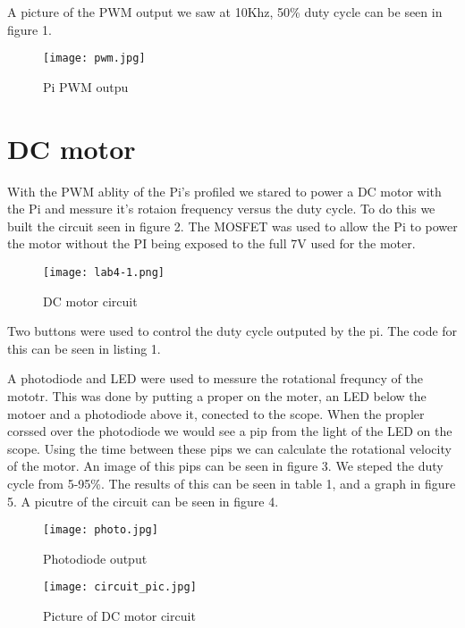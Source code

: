 \documentclass[prl,12pt,notitlepage,aps,onecolumn,superscriptaddress]{revtex4-1}
\begin{document}
A picture of the PWM output we saw at 10Khz, 50\% duty cycle can be seen in figure 1.

\begin{figure}[h]
\begin{center}
\texttt{[image: pwm.jpg]}
\end{center}
\caption{\label{fig:pic} Pi PWM outpu}
\end{figure}

\section{DC motor}
With the PWM ablity of the Pi's profiled we stared to power a DC motor with the Pi and messure it's rotaion frequency versus the duty cycle. To do this we built the circuit seen in figure 2. The MOSFET was used to allow the Pi to power the motor without the PI being exposed to the full 7V used for the moter. 

\begin{figure}[h]
\begin{center}
\texttt{[image: lab4-1.png]}
\end{center}
\caption{\label{fig:pic}DC motor circuit}
\end{figure}

Two buttons were used to control the duty cycle outputed by the pi. The code for this can be seen in listing 1.

A photodiode and LED were used to messure the rotational frequncy of the mototr. This was done by putting a proper on the moter, an LED below the motoer and a photodiode above it, conected to the scope. When the propler corssed over the photodiode we would see a pip from the light of the LED on the scope. Using the time between these pips we can calculate the rotational velocity of the motor. An image of this pips can be seen in figure 3. We steped the duty cycle from 5-95\%. The results of this can be seen in table 1, and a graph in figure 5.  A picutre of the circuit can be seen in figure 4.

\begin{figure}[h]
\begin{center}
\texttt{[image: photo.jpg]}
\end{center}
\caption{\label{fig:pic} Photodiode output}
\end{figure}

\begin{figure}[h]
\begin{center}
\texttt{[image: circuit\_pic.jpg]}
\end{center}
\caption{\label{fig:pic} Picture of DC motor circuit}
\end{figure}
 
\end{document}
